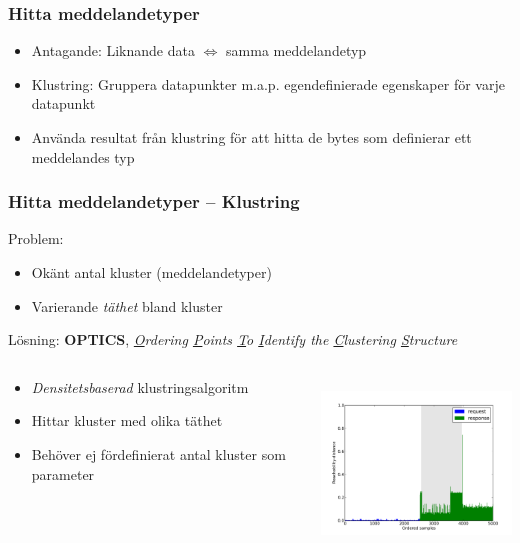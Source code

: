 \documentclass[xetex]{beamer}
\begin{document}
    \begin{frame}
        \frametitle{Hitta meddelandetyper}
        \begin{itemize}
            \item Antagande: Liknande data $\Leftrightarrow$ samma meddelandetyp
            \item Klustring: Gruppera datapunkter m.a.p. egendefinierade egenskaper
                för varje datapunkt
            \item Använda resultat från klustring för att hitta de bytes som
                definierar ett meddelandes typ
        \end{itemize}
    \end{frame}
    \begin{frame}
        \frametitle{Hitta meddelandetyper -- Klustring}
        Problem:
        \begin{itemize}
            \item Okänt antal kluster (meddelandetyper)
            \item Varierande \emph{täthet} bland kluster
        \end{itemize}
        Lösning: \textbf{OPTICS}, \scriptsize{
            \emph{\underline{O}rdering \underline{P}oints \underline{T}o
                  \underline{I}dentify the \underline{C}lustering 
                  \underline{S}tructure}}
        \vskip20pt
        \begin{columns}[t]
            \begin{column}[T]{6cm}
                \begin{itemize}
                    \item \emph{Densitetsbaserad} klustringsalgoritm
                    \item Hittar kluster med olika täthet
                    \item Behöver ej fördefinierat antal kluster som parameter
                \end{itemize}
            \end{column}
            \begin{column}[T]{6cm}
                \includegraphics[height=4.5cm]{img/hierextr.pdf}
            \end{column}
        \end{columns}
    \end{frame}
\end{document}
